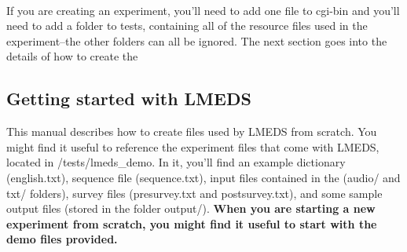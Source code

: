 \documentclass[12pt, oneside]{scrbook}   	%
\begin{document}
\paragraph{}

If you are creating an experiment, you'll need to add one file to cgi-bin and you'll need to add a folder to tests, containing all of the resource files used in the experiment--the other folders can all be ignored. The next section goes into the details of how to create the 

\subsection{Getting started with LMEDS}

This manual describes how to create files used by LMEDS from scratch.  You might find it useful to reference the experiment files that come with LMEDS, located in /tests/lmeds\_demo.  In it, you'll find an example dictionary (english.txt), sequence file (sequence.txt), input files contained in the (audio/ and txt/ folders), survey files (presurvey.txt and postsurvey.txt), and some sample output files (stored in the folder output/).
\textbf{When you are starting a new experiment from scratch, you might find it useful to start with the demo files provided.}
\end{document}
